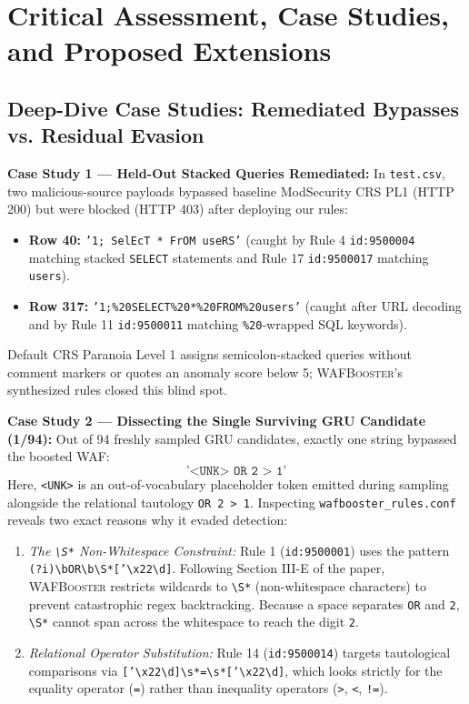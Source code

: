 \documentclass[conference]{IEEEtran}
\newcommand{\WAFB}{\textsc{WAFBooster}}
\begin{document}
\section{Critical Assessment, Case Studies, and Proposed Extensions}
\label{sec:critical}

\subsection{Deep-Dive Case Studies: Remediated Bypasses vs. Residual Evasion}
\textbf{Case Study 1 --- Held-Out Stacked Queries Remediated:} In \texttt{test.csv}, two malicious-source payloads bypassed baseline ModSecurity CRS PL1 (HTTP 200) but were blocked (HTTP 403) after deploying our rules:
\begin{itemize}
    \item \textbf{Row 40:} \texttt{'1; SelEcT * FrOM useRS'} (caught by Rule 4 \texttt{id:9500004} matching stacked \texttt{SELECT} statements and Rule 17 \texttt{id:9500017} matching \texttt{users}).
    \item \textbf{Row 317:} \texttt{'1;\%20SELECT\%20*\%20FROM\%20users'} (caught after URL decoding and by Rule 11 \texttt{id:9500011} matching \texttt{\%20}-wrapped SQL keywords).
\end{itemize}
Default CRS Paranoia Level 1 assigns semicolon-stacked queries without comment markers or quotes an anomaly score below 5; \WAFB{}'s synthesized rules closed this blind spot.

\textbf{Case Study 2 --- Dissecting the Single Surviving GRU Candidate (1/94):} Out of 94 freshly sampled GRU candidates, exactly one string bypassed the boosted WAF:
\[
\texttt{'<UNK> OR 2 > 1'}
\]
Here, \texttt{<UNK>} is an out-of-vocabulary placeholder token emitted during sampling alongside the relational tautology \texttt{OR 2 > 1}. Inspecting \texttt{wafbooster\_rules.conf} reveals two exact reasons why it evaded detection:
\begin{enumerate}
    \item \textit{The \texttt{\textbackslash S*} Non-Whitespace Constraint:} Rule 1 (\texttt{id:9500001}) uses the pattern \texttt{(?i)\textbackslash bOR\textbackslash b\textbackslash S*['\textbackslash x22\textbackslash d]}. Following Section III-E of the paper, \WAFB{} restricts wildcards to \texttt{\textbackslash S*} (non-whitespace characters) to prevent catastrophic regex backtracking. Because a space separates \texttt{OR} and \texttt{2}, \texttt{\textbackslash S*} cannot span across the whitespace to reach the digit \texttt{2}.
    \item \textit{Relational Operator Substitution:} Rule 14 (\texttt{id:9500014}) targets tautological comparisons via \texttt{['\textbackslash x22\textbackslash d]\textbackslash s*=\textbackslash s*['\textbackslash x22\textbackslash d]}, which looks strictly for the equality operator (\texttt{=}) rather than inequality operators (\texttt{>}, \texttt{<}, \texttt{!=}).
\end{enumerate}
\end{document}
